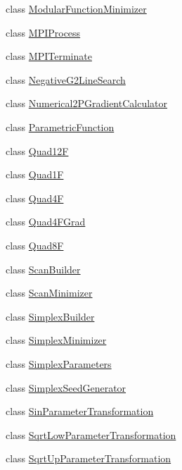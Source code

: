 \begin{DoxyCompactItemize}
class \mbox{\hyperlink{classROOT_1_1Minuit2_1_1ModularFunctionMinimizer}{Modular\+Function\+Minimizer}}
\item 
class \mbox{\hyperlink{classROOT_1_1Minuit2_1_1MPIProcess}{M\+P\+I\+Process}}
\item 
class \mbox{\hyperlink{classROOT_1_1Minuit2_1_1MPITerminate}{M\+P\+I\+Terminate}}
\item 
class \mbox{\hyperlink{classROOT_1_1Minuit2_1_1NegativeG2LineSearch}{Negative\+G2\+Line\+Search}}
\item 
class \mbox{\hyperlink{classROOT_1_1Minuit2_1_1Numerical2PGradientCalculator}{Numerical2\+P\+Gradient\+Calculator}}
\item 
class \mbox{\hyperlink{classROOT_1_1Minuit2_1_1ParametricFunction}{Parametric\+Function}}
\item 
class \mbox{\hyperlink{classROOT_1_1Minuit2_1_1Quad12F}{Quad12F}}
\item 
class \mbox{\hyperlink{classROOT_1_1Minuit2_1_1Quad1F}{Quad1F}}
\item 
class \mbox{\hyperlink{classROOT_1_1Minuit2_1_1Quad4F}{Quad4F}}
\item 
class \mbox{\hyperlink{classROOT_1_1Minuit2_1_1Quad4FGrad}{Quad4\+F\+Grad}}
\item 
class \mbox{\hyperlink{classROOT_1_1Minuit2_1_1Quad8F}{Quad8F}}
\item 
class \mbox{\hyperlink{classROOT_1_1Minuit2_1_1ScanBuilder}{Scan\+Builder}}
\item 
class \mbox{\hyperlink{classROOT_1_1Minuit2_1_1ScanMinimizer}{Scan\+Minimizer}}
\item 
class \mbox{\hyperlink{classROOT_1_1Minuit2_1_1SimplexBuilder}{Simplex\+Builder}}
\item 
class \mbox{\hyperlink{classROOT_1_1Minuit2_1_1SimplexMinimizer}{Simplex\+Minimizer}}
\item 
class \mbox{\hyperlink{classROOT_1_1Minuit2_1_1SimplexParameters}{Simplex\+Parameters}}
\item 
class \mbox{\hyperlink{classROOT_1_1Minuit2_1_1SimplexSeedGenerator}{Simplex\+Seed\+Generator}}
\item 
class \mbox{\hyperlink{classROOT_1_1Minuit2_1_1SinParameterTransformation}{Sin\+Parameter\+Transformation}}
\item 
class \mbox{\hyperlink{classROOT_1_1Minuit2_1_1SqrtLowParameterTransformation}{Sqrt\+Low\+Parameter\+Transformation}}
\item 
class \mbox{\hyperlink{classROOT_1_1Minuit2_1_1SqrtUpParameterTransformation}{Sqrt\+Up\+Parameter\+Transformation}}

\end{DoxyCompactItemize}
